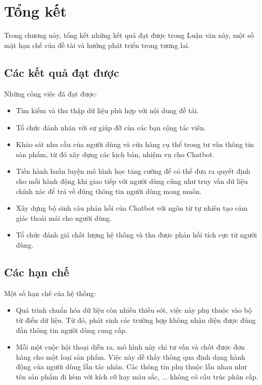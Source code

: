 \chapter{Tổng kết}

Trong chương này, tổng kết những kết quả đạt được trong Luận văn này, một số mặt hạn chế của đề tài và hướng phát triển trong tương lai.

\section{Các kết quả đạt được}
Những công việc đã đạt được:

\begin{itemize}
    \item Tìm kiếm và thu thập dữ liệu phù hợp với nội dung đề tài. 
    \item Tổ chức đánh nhãn với sự giúp đỡ của các bạn cộng tác viên.
    \item Khảo sát nhu cầu của người dùng và cửa hàng cụ thể trong tư vấn thông tin sản phẩm, từ đó xây dựng các kịch bản, nhiệm vụ cho Chatbot.
    \item Tiến hành huấn luyện mô hình học tăng cường để có thể đưa ra quyết định cho mỗi hành động khi giao tiếp với người dùng cũng như truy vấn dữ liệu chính xác để trả về đúng thông tin người dùng mong muốn.
    \item Xây dựng bộ sinh câu phản hồi của Chatbot với ngôn từ tự nhiên tạo cảm giác thoải mái cho người dùng.
    \item Tổ chức đánh giá chất lượng hệ thống và thu được phản hồi tích cực từ người dùng.
\end{itemize}

\section{Các hạn chế}
Một số hạn chế của hệ thống:

\begin{itemize}
    \item Quá trình chuẩn hóa dữ liệu còn nhiều thiếu sót, việc này phụ thuộc vào bộ từ điển dữ liệu. Từ đó, phát sinh các trường hợp không nhận diện được đúng đắn thông tin người dùng cung cấp. 
    \item Mỗi một cuộc hội thoại diễn ra, mô hình này chỉ tư vấn và chốt được đơn hàng cho một loại sản phẩm. Việc này dễ thấy thông qua định dạng hành động của người dùng lẫn tác nhân. Các thông tin phụ thuộc lẫn nhau như tên sản phẩm đi kèm với kích cỡ hay màu sắc, ... không có cấu trúc phân cấp.
\end{itemize}

